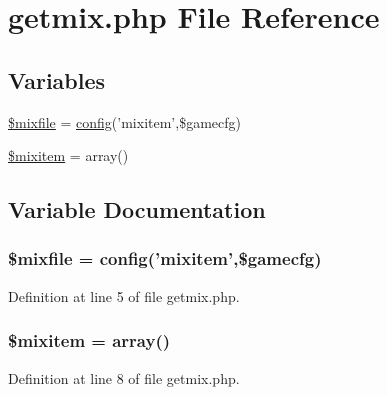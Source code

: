 \hypertarget{getmix_8php}{\section{getmix.\+php File Reference}
\label{getmix_8php}
}
\subsection*{Variables}
\begin{DoxyCompactItemize}
\item 
\hyperlink{getmix_8php_affc0dbcabcc950d3d33132839350597f}{\$mixfile} = \hyperlink{global_8func_8php_a239de3ed26da8daceb8acacdcb03325d}{config}('mixitem',\$gamecfg)
\item 
\hyperlink{getmix_8php_a08fb2c31e8018cff0f4a53550a5f4224}{\$mixitem} = array()
\end{DoxyCompactItemize}


\subsection{Variable Documentation}
\hypertarget{getmix_8php_affc0dbcabcc950d3d33132839350597f}{
\subsubsection[{\$mixfile}]{\setlength{\rightskip}{0pt plus 5cm}\$mixfile = {\bf config}('mixitem',\$gamecfg)}}\label{getmix_8php_affc0dbcabcc950d3d33132839350597f}


Definition at line 5 of file getmix.\+php.

\hypertarget{getmix_8php_a08fb2c31e8018cff0f4a53550a5f4224}{
\subsubsection[{\$mixitem}]{\setlength{\rightskip}{0pt plus 5cm}\$mixitem = array()}}\label{getmix_8php_a08fb2c31e8018cff0f4a53550a5f4224}


Definition at line 8 of file getmix.\+php.

